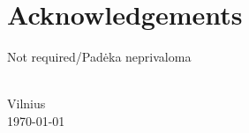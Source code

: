 {}

\chapter*{Acknowledgements}

Not required/Padėka neprivaloma


{\flushright  \thesisAuthorName \ \thesisAuthorSurname \\ Vilnius\\ \today\\ }

